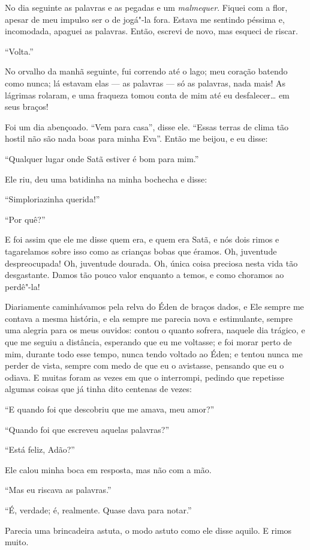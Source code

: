 No dia seguinte as palavras e as pegadas e um \textit{malmequer}. Fiquei com a
flor, apesar de meu impulso ser o de jogá"-la fora. Estava me sentindo péssima e,
incomodada, apaguei as palavras. Então, escrevi de novo, mas
esqueci de riscar.

“Volta.”

No orvalho da manhã seguinte, fui correndo até o lago; meu coração batendo como
nunca; lá estavam elas --- as palavras --- só as palavras, nada mais!
As lágrimas rolaram, e uma fraqueza tomou conta de mim até eu desfalecer\ldots{} em
seus braços!

Foi um dia abençoado. “Vem para casa”, disse ele. “Essas terras de clima tão hostil
não são nada boas para minha Eva”. Então me beijou, e eu disse:

“Qualquer lugar onde Satã estiver é bom para mim.”

Ele riu, deu uma batidinha na minha bochecha e disse:

“Simploriazinha querida!”

“Por quê?” 

E foi assim que ele me disse quem era, e quem era Satã, e nós dois rimos e tagarelamos
sobre isso como as crianças bobas que éramos. Oh, juventude despreocupada! Oh,
juventude dourada. Oh, única coisa preciosa nesta vida tão desgastante. Damos
tão pouco valor enquanto a temos, e como choramos ao perdê"-la!

Diariamente caminhávamos pela relva do Éden de braços dados, e
Ele sempre me contava a mesma história, e ela sempre me parecia nova e
estimulante, sempre uma alegria para os meus ouvidos: contou o quanto sofrera,
naquele dia trágico, e que me seguiu a distância, esperando que eu me voltasse; e
foi morar perto de mim, durante todo esse tempo, nunca tendo voltado ao
Éden; e tentou nunca me perder de vista, sempre com medo de que eu o avistasse,
pensando que eu o odiava. E muitas foram as vezes em que o interrompi, pedindo que
repetisse algumas coisas que já tinha dito centenas de vezes:

“E quando foi que descobriu que me amava, meu amor?”

“Quando foi que escreveu aquelas palavras?”

“Está feliz, Adão?”

Ele calou minha boca em resposta, mas não com a mão.

“Mas eu riscava as palavras.”

“É, verdade; é, realmente. Quase dava para notar.”

Parecia uma brincadeira astuta, o modo astuto como ele disse aquilo. E rimos muito.

